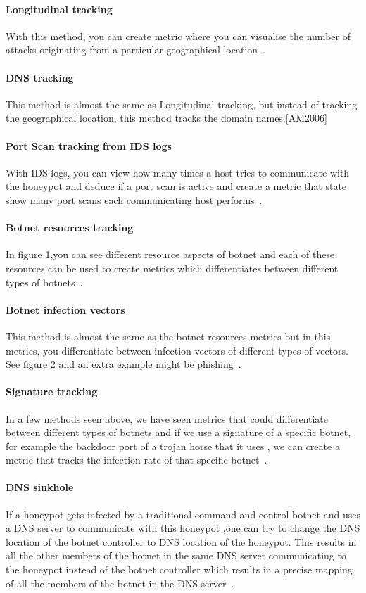 \paragraph{Longitudinal tracking}
With this method, you can create metric where you can visualise the number of attacks originating from a particular geographical location~\cite{AM2006}.

\paragraph{DNS tracking}
This method is almost the same as Longitudinal tracking, but instead of tracking the geographical location, this method tracks the domain names.[AM2006]

\paragraph{Port Scan tracking from IDS logs}
With IDS logs, you can view how many times a host tries to communicate with the honeypot and deduce if a port scan is active and create a metric that state show many port scans each communicating host performs~\cite{WP2010}.

\paragraph{Botnet resources tracking}
In figure 1,you can see different resource aspects of botnet and each of these resources can be used to create metrics which differentiates between different types of botnets~\cite{GJ2007}.

\paragraph{Botnet infection vectors}
This method is almost the same as the botnet resources metrics but in this metrics, you differentiate between  infection vectors of different types of vectors. See figure 2 and an extra example might be phishing~\cite{GJ2007}.

\paragraph{Signature tracking}
In a few methods seen above, we have seen metrics that could differentiate between different types of botnets and if we use a signature of a specific botnet, for example the backdoor port of a trojan horse that it uses , we can create a metric that tracks the infection rate of that specific botnet~\cite{AM2005}.

\paragraph{DNS sinkhole}
If a honeypot gets infected by a traditional command and control botnet  and uses a DNS server to communicate with this honeypot ,one can try to change the DNS location of the botnet controller to DNS location of the honeypot. This results in all the other members of the botnet in the same DNS server communicating to the honeypot instead of the botnet controller which results in a precise mapping of all the members of the botnet in the DNS server~\cite{WP2010}.
